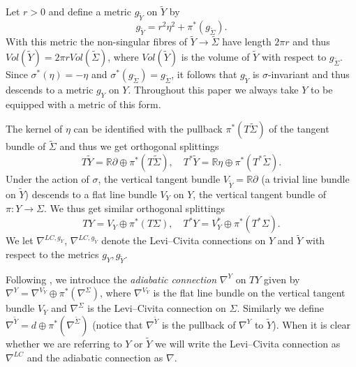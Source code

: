 \documentclass{amsart}
\theoremstyle{definition}
\theoremstyle{remark}
\numberwithin{equation}{section}
\begin{document}
Let $r > 0$ and define a metric $g_{\widetilde{Y}}$ on $\widetilde{Y}$ by
\[
g_{\widetilde{Y}} = r^2 \eta^2 + \pi^*(g_{\widetilde{\Sigma}}).
\]
With this metric the non-singular fibres of $\widetilde{Y} \to \widetilde{\Sigma}$ have length $2\pi r$ and thus $Vol(\widetilde{Y}) = 2\pi r Vol(\widetilde{\Sigma})$, where $Vol(\widetilde{Y})$ is the volume of $\widetilde{Y}$ with respect to $g_{\widetilde{\Sigma}}$. Since $\sigma^*(\eta) = -\eta$ and $\sigma^*( g_{\widetilde{\Sigma}}) = g_{\widetilde{\Sigma}}$, it follows that $g_{\widetilde{Y}}$ is $\sigma$-invariant and thus descends to a metric $g_Y$ on $Y$. Throughout this paper we always take $Y$ to be equipped with a metric of this form.

The kernel of $\eta$ can be identified with the pullback $\pi^*(T\widetilde{\Sigma})$ of the tangent bundle of $\widetilde{\Sigma}$ and thus we get orthogonal splittings
\[
T\widetilde{Y} = \mathbb{R}\partial \oplus \pi^*(T\widetilde{\Sigma}), \quad T^*\widetilde{Y} = \mathbb{R}\eta \oplus \pi^*(T^*\widetilde{\Sigma}).
\]
Under the action of $\sigma$, the vertical tangent bundle $V_{\widetilde{Y}} = \mathbb{R}\partial$ (a trivial line bundle on $\widetilde{Y}$) descends to a flat line bundle $V_Y$ on $Y$, the vertical tangent bundle of $\pi \colon Y \to \Sigma$. We thus get similar orthogonal splittings
\[
TY = V_Y \oplus \pi^*(T\Sigma), \quad T^*Y = V_Y^* \oplus \pi^*(T^*\Sigma).
\]
We let $\nabla^{LC,g_Y}$, $\nabla^{LC,g_{\widetilde{Y}}}$ denote the Levi--Civita connections on $Y$ and $\widetilde{Y}$ with respect to the metrics $g_Y, g_{\widetilde{Y}}$. 

Following \cite{moy}, we introduce the {\em adiabatic connection} $\nabla^Y$ on $TY$ given by $\nabla^Y = \nabla^{V_Y} \oplus \pi^*(\nabla^{\Sigma})$, where $\nabla^{V_Y}$ is the flat line bundle on the vertical tangent bundle $V_Y$ and $\nabla^\Sigma$ is the Levi--Civita connection on $\Sigma$. Similarly we define $\nabla^{\widetilde{Y}} = d \oplus \pi^*(\nabla^{\widetilde{\Sigma}})$ (notice that $\nabla^{\widetilde{Y}}$ is the pullback of $\nabla^Y$ to $\widetilde{Y}$). When it is clear whether we are referring to $Y$ or $\widetilde{Y}$ we will write the Levi--Civita connection as $\nabla^{LC}$ and the adiabatic connection as $\nabla$.
\end{document}
